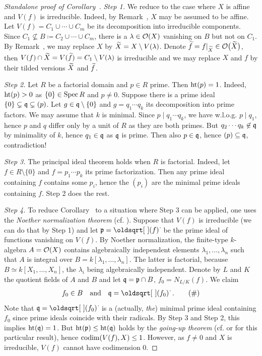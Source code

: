\documentclass[a4paper,parskip=half,numbers=enddot, DIV=12]{scrreprt}
\begin{document}
\begin{proof}[Standalone proof of Corollary~]
	\emph{Step 1.} We reduce to the case where $X$ is affine and $V(f)$ is irreducible. Indeed, by Remark~, $X$ may be assumed to be affine. Let $V(f)=C_1\cup\cdots\cup C_m$ be its decomposition into irreducible components. Since $C_1\not\subseteq B\coloneqq C_2\cup\cdots\cup C_m$, there is a $\lambda\in\mathcal{O}(X)$ vanishing on $B$ but not on $C_1$. By Remark~, we may replace $X$ by $\snake X=X\setminus V(\lambda)$. Denote $\snake f=f|_{\snake X}\in\Oo\big(\snake X\big)$, then $V(f)\cap \snake X=V(\snake f)=C_1\setminus V(\lambda)$ is irreducible and we may replace $X$ and $f$ by their tilded versions $\snake X$ and $\snake f$.
	
	\emph{Step 2.} Let $R$ be a factorial domain and $p\in R$ prime. Then $\operatorname{ht}(p)=1$. Indeed, $\operatorname{ht}(p)>0$ as $\{0\}\in\operatorname{Spec} R$ and $p\not=0$. Suppose there is a prime ideal $\{0\}\subsetneq\mathfrak{q}\subsetneq(p)$. Let $g\in\mathfrak{q}\setminus\{0\}$ and $g=q_1\cdots q_k$ its decomposition into prime factors. We may assume that $k$ is minimal. Since $p\mid q_1\cdots q_k$, we have w.l.o.g. $p\mid q_1$, hence $p$ and $q$ differ only by a unit of $R$ as they are both primes. But $q_2\cdots q_k\not\in\mathfrak{q}$ by minimality of $k$, hence $q_1\in\mathfrak{q}$ as $\mathfrak{q}$ is prime. Then also $p\in\mathfrak{q}$, hence $(p)\subseteq\mathfrak{q}$, contradiction!
	
	\emph{Step 3.} The principal ideal theorem holds when $R$ is factorial. Indeed, let $f\in R\setminus\{0\}$ and $f=p_1\cdots p_k$ its prime factorization. Then any prime ideal containing $f$ contains some $p_i$, hence the $(p_i)$ are the minimal prime ideals containing $f$. Step 2 does the rest.
	
	\emph{Step 4.} To reduce Corollary~ to a situation where Step 3 can be applied, one uses the \emph{Noether normalization theorem} (cf. \cite[Theorem~3]{alg1}). Suppose that $V(f)$ is irreducible (we can do that by Step 1) and let $\pp=\sqrt{(f)}$ be the prime ideal of functions vanishing on $V(f)$. By Noether normalization, the finite-type $k$-algebra $A=\mathcal{O}(X)$ contains algebraically independent elements $\lambda_1,\ldots,\lambda_n$ such that $A$ is integral over $B=k[\lambda_1,\ldots,\lambda_n]$. The latter is factorial, because $B\simeq k[X_1,\ldots,X_n]$, the $\lambda_i$ being algebraically independent. Denote by $L$ and $K$ the quotient fields of $A$ and $B$ and let $\mathfrak{q}=\mathfrak{p}\cap B$, $f_0=N_{L/K}(f)$. We claim
	\begin{align}\lbl{eq:GoingUp2Bapplied}
		f_0\in B\quad\text{and}\quad \qq=\sqrt{(f_0)}\;.\tag{\#}
	\end{align}
	Note that $\qq=\sqrt{(f_0)}$ is a (actually, \emph{the}) minimal prime ideal containing $f_0$ since prime ideals coincide with their radicals. By Step 3 and Step 2, this implies $\operatorname{ht}(\mathfrak{q})=1$. But $\operatorname{ht}(\mathfrak{p})\leq\operatorname{ht}(\mathfrak{q})$ holds by the \emph{going-up theorem} (cf. \cite[Theorem~7]{alg1} or \cite[Fact~2.6.2]{alg1} for this particular result), hence $\operatorname{codim}(V(f), X)\leq 1$. However, as $f\not=0$ and $X$ is irreducible, $V(f)$ cannot have codimension 0. 
	

\end{proof}
\end{document}
